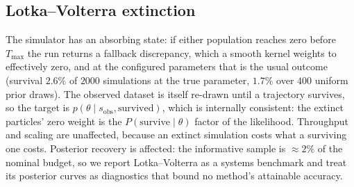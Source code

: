 \documentclass[pdflatex,sn-mathphys-num]{sn-jnl}
\theoremstyle{plain}
\theoremstyle{definition}
\begin{document}
\begin{appendices}
\subsection{Lotka--Volterra extinction}
The simulator has an absorbing state: if either population reaches zero before $T_{\max}$ the run returns a fallback discrepancy, which a smooth kernel weights to effectively zero, and at the configured parameters that is the usual outcome (survival $2.6\%$ of $2000$ simulations at the true parameter, $1.7\%$ over $400$ uniform prior draws). The observed dataset is itself re-drawn until a trajectory survives, so the target is $p(\theta \mid s_{\mathrm{obs}}, \text{survived})$, which is internally consistent: the extinct particles' zero weight is the $P(\text{survive}\mid\theta)$ factor of the likelihood. Throughput and scaling are unaffected, because an extinct simulation costs what a surviving one costs. Posterior recovery is affected: the informative sample is ${\approx}2\%$ of the nominal budget, so we report Lotka--Volterra as a systems benchmark and treat its posterior curves as diagnostics that bound no method's attainable accuracy.

\end{appendices}


\end{document}

